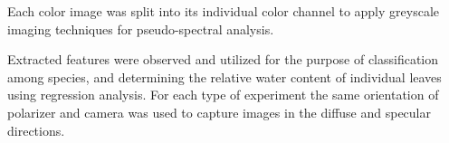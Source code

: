 Each color image was split into its individual color channel to apply greyscale imaging techniques for pseudo-spectral analysis.

Extracted features were observed and utilized for the purpose of classification among species, and determining the relative water content of individual leaves using regression analysis.  For each type of experiment the same orientation of polarizer and camera was used to capture images in the diffuse and specular directions.
